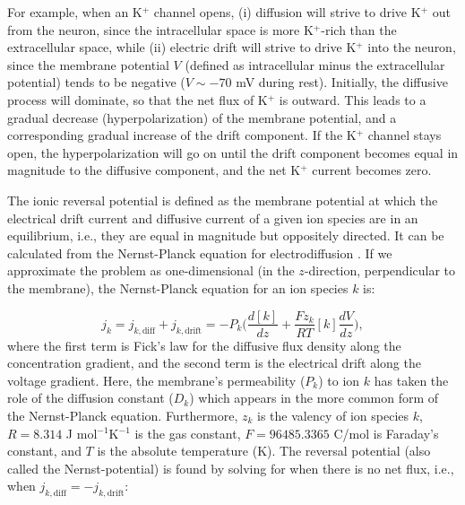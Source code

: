 For example, when an K$^+$ channel opens, (i) diffusion will strive to drive K$^+$ out from the neuron, since the intracellular space is more K$^+$-rich than the extracellular space, while (ii) electric drift will strive to drive K$^+$ into the neuron, since the membrane potential $V$ (defined as intracellular minus the extracellular potential) tends to be negative ($V \sim - 70$  mV during rest). Initially, the diffusive process will dominate, so that the net flux of K$^+$ is outward. This leads to a gradual decrease (hyperpolarization) of the membrane potential,  and a corresponding gradual increase of the drift component. If the K$^+$ channel stays open, the hyperpolarization will go on until the drift component becomes equal in magnitude to the diffusive component, and the net K$^+$ current becomes zero.

The ionic reversal potential is defined as the membrane potential at which the electrical drift current and diffusive current of a given ion species are in an equilibrium, i.e., they are equal in magnitude but oppositely directed. It can be calculated from the Nernst-Planck equation for electrodiffusion . If we approximate the problem as one-dimensional (in the $z$-direction, perpendicular to the membrane), the Nernst-Planck equation for an ion species $k$ is:

\begin{equation}
j_k = j_{k,\text{diff}} + j_{k,\text{drift}} 
=  - P_k \Big(\frac{d[k]}{dz} +  \frac{Fz_k}{RT}  [k] \frac{dV}{dz} \Big), 
\label{eq:Neuron:NP1D}
\end{equation}
where the first term is Fick's law for the diffusive flux density along the concentration gradient, and the second term is the electrical drift along the voltage gradient. Here, the membrane's permeability ($P_k$) to ion $k$ has taken the role of the diffusion constant ($D_k$) which appears in the more common form of the Nernst-Planck equation. Furthermore, $z_{k}$ is the valency of ion species $k$, $R = 8.314$ J mol$^{-1}$K$^{-1}$ is the gas constant, $F = 96485.3365$ C/mol is Faraday's constant, and $T$ is the absolute temperature (K). The reversal potential (also called the Nernst-potential) is found by solving for when there is no net flux, i.e., when  $j_{k,\text{diff}} = - j_{k,\text{drift}}$:

